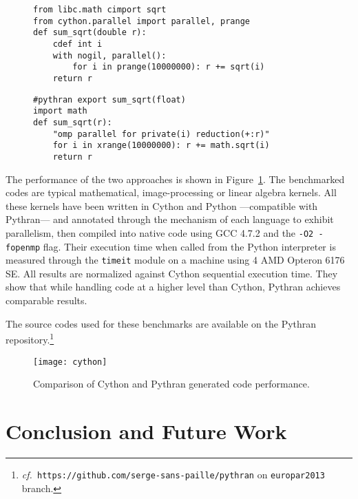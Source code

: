 \documentclass{llncs}
\newcommand\see{\emph{cf.\ }}
\begin{document}
\begin{figure}

    \begin{lstlisting}[label={lst:cython-sample}, caption={Cython implementation
    of a parallel reduction.}]
from libc.math cimport sqrt
from cython.parallel import parallel, prange
def sum_sqrt(double r):
    cdef int i
    with nogil, parallel():
        for i in prange(10000000): r += sqrt(i)
    return r
    \end{lstlisting}
%
    \begin{lstlisting}[label={lst:pythran-sample}, caption={Pythran implementation
    of a parallel reduction.}]
#pythran export sum_sqrt(float)
import math
def sum_sqrt(r):
    "omp parallel for private(i) reduction(+:r)"
    for i in xrange(10000000): r += math.sqrt(i)
    return r
    \end{lstlisting}
\end{figure}



The performance of the two approaches is shown in
Figure~\ref{fig:cython-pythran}.  The benchmarked codes are typical
mathematical, image-processing or linear algebra kernels. All these kernels
have been written in Cython and Python ---compatible with Pythran--- and
annotated through the mechanism of each language to exhibit parallelism, then
compiled into native code using GCC 4.7.2 and the \texttt{-O2 -fopenmp} flag.
Their execution time when called from the Python interpreter is measured
through the \texttt{timeit} module on a machine using 4 AMD Opteron 6176 SE.
All results are normalized against Cython sequential execution time. They show
that while handling code at a higher level than Cython, Pythran achieves comparable
results.

The source codes used for these benchmarks are available on the Pythran
repository.\footnote{\see \texttt{https://github.com/serge-sans-paille/pythran} on \texttt{europar2013}
branch.} 

\begin{figure}[ht]
    \texttt{[image: cython]}
    \caption{Comparison of Cython and Pythran generated code performance.}
    \label{fig:cython-pythran}
\end{figure}




\section{Conclusion and Future Work}
\end{document}

